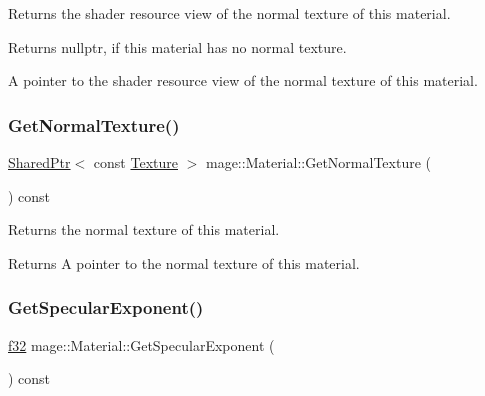 Returns the shader resource view of the normal texture of this material.

\begin{DoxyReturn}{Returns}
{\ttfamily nullptr}, if this material has no normal texture. 

A pointer to the shader resource view of the normal texture of this material. 
\end{DoxyReturn}
\hypertarget{structmage_1_1_material_a41a286cf05a2627ee0baef602b01a1fb}{}\label{structmage_1_1_material_a41a286cf05a2627ee0baef602b01a1fb} 
\subsubsection{\texorpdfstring{Get\+Normal\+Texture()}{GetNormalTexture()}}
{\footnotesize\ttfamily \hyperlink{namespacemage_a1e01ae66713838a7a67d30e44c67703e}{Shared\+Ptr}$<$ const \hyperlink{classmage_1_1_texture}{Texture} $>$ mage\+::\+Material\+::\+Get\+Normal\+Texture (\begin{DoxyParamCaption}{ }\end{DoxyParamCaption}) const\hspace{0.3cm}{\ttfamily [noexcept]}}

Returns the normal texture of this material.

\begin{DoxyReturn}{Returns}
A pointer to the normal texture of this material. 
\end{DoxyReturn}
\hypertarget{structmage_1_1_material_a4a4f8224baa0b8275e6b209c3799f7cd}{}\label{structmage_1_1_material_a4a4f8224baa0b8275e6b209c3799f7cd} 
\subsubsection{\texorpdfstring{Get\+Specular\+Exponent()}{GetSpecularExponent()}}
{\footnotesize\ttfamily \hyperlink{namespacemage_a6a44ad388483959dc4dff9f2aef91431}{f32} mage\+::\+Material\+::\+Get\+Specular\+Exponent (\begin{DoxyParamCaption}{ }\end{DoxyParamCaption}) const\hspace{0.3cm}{\ttfamily [noexcept]}}

